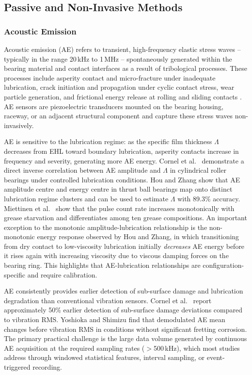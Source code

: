 \subsection{Passive and Non-Invasive Methods}
\label{subsec:passive_noninv}

\subsubsection{Acoustic Emission}
\label{subsubsec:ae}
Acoustic emission (AE) refers to transient, high-frequency elastic stress waves -- typically in the range 20\,kHz to 1\,MHz -- spontaneously generated within the bearing material and contact interfaces as a result of tribological processes. These processes include asperity contact and micro-fracture under inadequate lubrication, crack initiation and propagation under cyclic contact stress, wear particle generation, and frictional energy release at rolling and sliding contacts \cite{hou_-situ_2025,delft_university_of_technology_tu_delft_influence_2024,scheeren_acoustic_2024}. AE sensors are piezoelectric transducers mounted on the bearing housing, raceway, or an adjacent structural component and capture these stress waves non-invasively.

AE is sensitive to the lubrication regime: as the specific film thickness $\Lambda$ decreases from EHL toward boundary lubrication, asperity contacts increase in frequency and severity, generating more AE energy. Cornel et al.\ \cite{cornel_condition_2021} demonstrate a direct inverse correlation between AE amplitude and $\Lambda$ in cylindrical roller bearings under controlled lubrication conditions. Hou and Zhang \cite{hou_-situ_2025} show that AE amplitude centre and energy centre in thrust ball bearings map onto distinct lubrication regime clusters and can be used to estimate $\Lambda$ with 89.3\% accuracy. Miettinen et al.\ \cite{miettinen_analysis_2001} show that the pulse count rate increases monotonically with grease starvation and differentiates among ten grease compositions. An important exception to the monotonic amplitude-lubrication relationship is the non-monotonic energy response observed by Hou and Zhang, in which transitioning from dry contact to low-viscosity lubrication initially \textit{decreases} AE energy before it rises again with increasing viscosity due to viscous damping forces on the bearing ring. This highlights that AE-lubrication relationships are configuration-specific and require calibration.

AE consistently provides earlier detection of sub-surface damage and lubrication degradation than conventional vibration sensors. Cornel et al.\ \cite{cornel_condition_2021} report approximately 50\% earlier detection of sub-surface damage deviations compared to vibration RMS. Yoshioka and Shimizu \cite{yoshioka_monitoring_2009} find that demodulated AE mean changes before vibration RMS in conditions without significant fretting corrosion. The primary practical challenge is the large data volume generated by continuous AE acquisition at the required sampling rates ($>$500\,kHz), which most studies address through windowed statistical features, interval sampling, or event-triggered recording.

